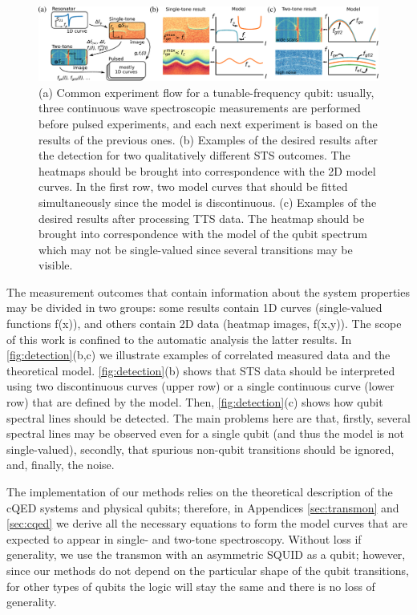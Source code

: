 \documentclass[%
 aip,
 amsmath,amssymb,
 reprint,%
]{revtex4-1}
\begin{document}
\begin{figure}
	\centering
	\includegraphics[width=\linewidth]{detection}
	\caption{(a) Common experiment flow for a tunable-frequency qubit: usually, three continuous wave spectroscopic measurements are performed before pulsed experiments, and each next experiment is based on the results of the previous ones. (b) Examples of the desired results after the detection for two qualitatively different STS outcomes. The heatmaps should be brought into correspondence with the 2D model curves. In the first row, two model curves that should be fitted simultaneously since the model is discontinuous. (c) Examples of the desired results after processing TTS data. The heatmap should be brought into correspondence with the model of the qubit spectrum which may not be single-valued since several transitions may be visible.}
	\label{fig:detection}	
\end{figure} 

The measurement outcomes that contain information about the system properties may be divided in two groups: some results contain 1D curves (single-valued functions f(x)), and others contain 2D data (heatmap images, f(x,y)). The scope of this work is confined to the automatic analysis the latter results. In \autoref{fig:detection}(b,c) we illustrate examples of correlated measured data and the theoretical model. \autoref{fig:detection}(b) shows that STS data should be interpreted using two discontinuous curves (upper row) or a single continuous curve (lower row) that are defined by the model. Then, \autoref{fig:detection}(c) shows how qubit spectral lines should be detected. The main problems here are that, firstly, several spectral lines may be observed even for a single qubit (and thus the model is not single-valued), secondly, that spurious non-qubit transitions should be ignored, and, finally, the noise.

The implementation of our methods relies on the theoretical description of the cQED systems and physical qubits; therefore, in Appendices \ref{sec:transmon} and \ref{sec:cqed} we derive all the necessary equations to form the model curves that are expected to appear in single- and two-tone spectroscopy. Without loss if generality, we use the transmon\cite{koch2007} with an asymmetric SQUID as a qubit; however, since our methods do not depend on the particular shape of the qubit transitions, for other types of qubits the logic will stay the same and there is no loss of generality.
\end{document}
